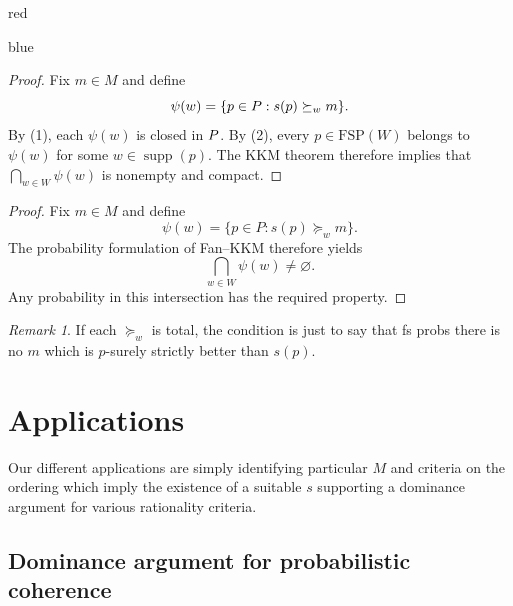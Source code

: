 \documentclass[11pt]{article}
\theoremstyle{definition}
\theoremstyle{remark}
\newtheorem{remark}[theorem]{Remark}
\newenvironment{AIwritten}{\begin{color}{blue}}{\end{color}}
\begin{document}
\begin{color}{red}
\begin{AIwritten}
	
	\begin{proof}
		Fix $m\in M$ and define
		\[
		\psi(w)=\{p\in P : s(p)\succeq_w m\}.
		\]
		By (1), each $\psi(w)$ is closed in $P$. By (2), every
		$p\in\mathrm{FSP}(W)$ belongs to $\psi(w)$ for some
		$w\in\operatorname{supp}(p)$. The KKM theorem therefore
		implies that $\bigcap_{w\in W}\psi(w)$ is nonempty and compact.
	
	\end{proof}
	
\end{AIwritten}

\begin{proof}
	Fix $m\in M$ and define
	\[
	\psi(w)=\{p\in P:s(p)\succeq_w m\}.
	\]
	The probability formulation of Fan--KKM therefore
	yields
	\[
	\bigcap_{w\in W}\psi(w)\neq\varnothing.
	\]
	Any probability in this intersection has the
	required property.
\end{proof}
\begin{remark}
	If each $\succeq_w$ is total, the condition is just to say that fs probs there is no $m$ which is $p$-surely strictly better than $s(p)$. 
\end{remark}
\end{color}

\color{black}

\section{Applications}

Our different applications are simply identifying particular $M$ and criteria on the ordering which imply the existence of a suitable $s$ supporting a dominance argument for various rationality criteria. 

\subsection{Dominance argument for probabilistic coherence}
\end{document}
